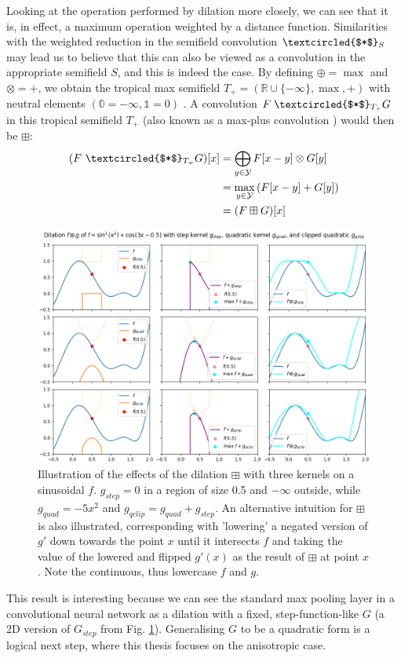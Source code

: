 \documentclass[a4paper, 12pt]{report}
\begin{document}
Looking at the operation performed by dilation more closely, we can see that it is, in effect, a maximum operation weighted by a distance function. Similarities with the weighted reduction in the semifield convolution $\textcircled{$*$}_S$ may lead us to believe that this can also be viewed as a convolution in the appropriate semifield $S$, and this is indeed the case. By defining $\oplus=\max$ and $\otimes=+$, we obtain the tropical max semifield $T_+=(\mathbb{R}\cup\{-\infty\},\max,+)$ with neutral elements $(\mathbb{0}=-\infty, \mathbb{1}=0)$ \cite{maragos, bellaardaxiomatic}. A convolution $F \;\textcircled{$*$}_{T_+} G$ in this tropical semifield $T_+$ (also known as a max-plus convolution \cite{maragos}) would then be $\boxplus$:
\begin{align*}
	(F ~\textcircled{$*$}_{T_+} G)[x]
	&= \bigoplus_{y\in \mathcal{Y}}F[x-y] \otimes G[y] \\
	&= \max_{y\in \mathcal{Y}}\left(F[x-y] + G[y]\right) \\
	&= (F \boxplus G)[x]
\end{align*}

\begin{figure}[h!]
  \includegraphics[width=\textwidth]{figures/dilation_illustration.png}
  \caption{Illustration of the effects of the dilation $\boxplus$ with three kernels on a sinusoidal $f$. $g_{step}=0$ in a region of size 0.5 and $-\infty$ outside, while $g_{quad}=-5x^2$ and $g_{qclip}=g_{quad}+g_{step}$. An alternative intuition for $\boxplus$ is also illustrated, corresponding with 'lowering' a negated version of $g'$ down towards the point $x$ until it intersects $f$ and taking the value of the lowered and flipped $g'(x)$ as the result of $\boxplus$ at point $x$. Note the continuous, thus lowercase $f$ and $g$.}
  \label{fig:dil-illust}
\end{figure}
\noindent
This result is interesting because we can see the standard max pooling layer in a convolutional neural network as a dilation with a fixed, step-function-like $G$ (a 2D version of $G_{step}$ from Fig. \ref{fig:dil-illust}). Generalising $G$ to be a quadratic form is a logical next step, where this thesis focuses on the anisotropic case.
\end{document}
